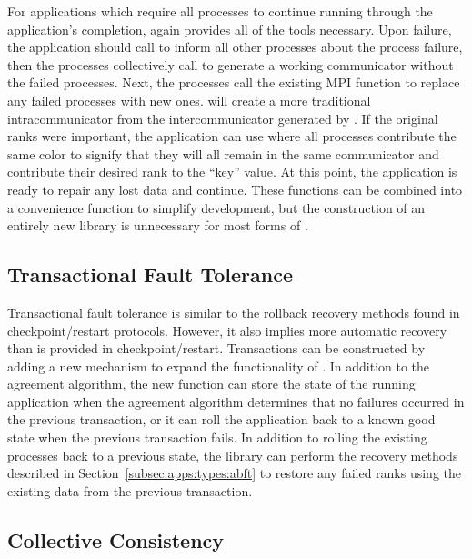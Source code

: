 For applications which require all processes to continue running through the 
application's completion, \ulfm again provides all of the tools necessary. Upon 
failure, the application should call  to inform all 
other processes about the process failure, then the processes collectively call 
 to generate a working communicator without the 
failed processes. Next, the processes call the existing MPI function 
 to replace any failed processes with new ones. 
 will create a more traditional intracommunicator 
from the intercommunicator generated by . If the 
original ranks were important, the application can use 
 where all processes contribute the same color to 
signify that they will all remain in the same communicator and contribute their 
desired rank to the ``key'' value. At this point, the application is ready to 
repair any lost data and continue. These functions can be combined into a 
convenience function to simplify development, but the construction of an 
entirely new library is unnecessary for most forms of \abft.

\subsection{Transactional Fault Tolerance}
\label{subsec:apps:types:transactions}

Transactional fault tolerance is similar to the rollback recovery methods found 
in checkpoint/restart protocols. However, it also implies more automatic 
recovery than is provided in checkpoint/restart. Transactions can be constructed 
by adding a new mechanism to expand the functionality of
. In addition to the agreement algorithm, the new 
function can store the state of the running application when the agreement 
algorithm determines that no failures occurred in the previous transaction, or 
it can roll the application back to a known good state when the previous 
transaction fails. In addition to rolling the existing processes back to a 
previous state, the library can perform the recovery methods described in 
Section~\ref{subsec:apps:types:abft} to restore any failed ranks using the 
existing data from the previous transaction.

\subsection{Collective Consistency}
\label{subsec:apps:types:consistency}

